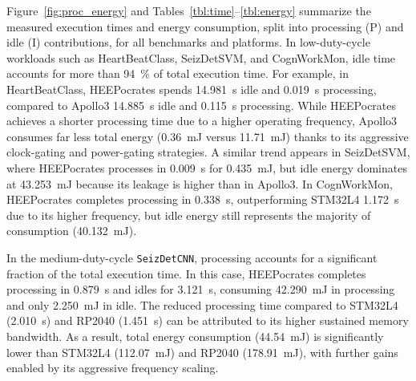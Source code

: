            Figure~\ref{fig:proc_energy} and Tables~\ref{tbl:time}--\ref{tbl:energy} summarize the measured execution times and energy consumption, split into processing (P) and idle (I) contributions, for all benchmarks and platforms. In low-duty-cycle workloads such as HeartBeatClass, SeizDetSVM, and CognWorkMon, idle time accounts for more than \SI{94}{\percent} of total execution time. For example, in HeartBeatClass, \mbox{HEEPocrates} spends \SI{14.981}{\second} idle and \SI{0.019}{\second} processing, compared to Apollo3 \SI{14.885}{\second} idle and \SI{0.115}{\second} processing. While \mbox{HEEPocrates} achieves a shorter processing time due to a higher operating frequency, Apollo3 consumes far less total energy (\SI{0.36}{\milli\joule} versus \SI{11.71}{\milli\joule}) thanks to its aggressive clock-gating and power-gating strategies. A similar trend appears in SeizDetSVM, where \mbox{HEEPocrates} processes in \SI{0.009}{\second} for \SI{0.435}{\milli\joule}, but idle energy dominates at \SI{43.253}{\milli\joule} because its leakage is higher than in Apollo3. In CognWorkMon, \mbox{HEEPocrates} completes processing in \SI{0.338}{\second}, outperforming STM32L4 \SI{1.172}{\second} due to its higher frequency, but idle energy still represents the majority of consumption (\SI{40.132}{\milli\joule}).
            
            In the medium-duty-cycle \texttt{SeizDetCNN}, processing accounts for a significant fraction of the total execution time. In this case, \mbox{HEEPocrates} completes processing in \SI{0.879}{\second} and idles for \SI{3.121}{\second}, consuming \SI{42.290}{\milli\joule} in processing and only \SI{2.250}{\milli\joule} in idle. The reduced processing time compared to STM32L4 (\SI{2.010}{\second}) and RP2040 (\SI{1.451}{\second}) can be attributed to its higher sustained memory bandwidth. As a result, total energy consumption (\SI{44.54}{\milli\joule}) is significantly lower than STM32L4 (\SI{112.07}{\milli\joule}) and RP2040 (\SI{178.91}{\milli\joule}), with further gains enabled by its aggressive frequency scaling.

